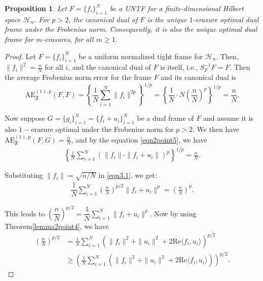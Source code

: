 \documentclass[final,1p,times]{elsarticle}
\newtheorem{prop}[thm]{Proposition}
\begin{document}
		

  \begin{prop}
Let \( F = \{f_i\}_{i=1}^N \) be a UNTF for a finite-dimensional Hilbert space \( \mathcal{H}_n \). For \( p > 2 \), the canonical dual of \( F \) is the unique  $1$-erasure optimal dual frame under the Frobenius norm. Consequently, it is also the unique optimal dual frame for $m$-erasures, for all \( m \geq 1 \).
\end{prop}


	

        
          \begin{proof}
Let \( F = \{f_i\}_{i=1}^N \) be a uniform normalized tight frame for \( \mathcal{H}_n \). Then,  \( \|f_i\|^2 = \frac{n}{N} \) for all \( i \), and the canonical dual of \( F \) is itself, i.e., \( S_F^{-1}F = F \). Then the average Frobenius norm error for the frame $F$ and its canonical dual is
$$\mathrm{AE}_{\mathfrak{F}}^{(1),p}(F, F) = \left\{ \frac{1}{N} \sum_{i=1}^N \|f_i\|^{2p} \right\}^{1/p} = \left\{ \frac{1}{N} \cdot N \left( \frac{n}{N} \right)^p \right\}^{1/p} = \frac{n}{N}.$$


Now suppose \( G = \{g_i\}_{i=1}^N = \{f_i + u_i\}_{i=1}^N \) be a dual frame of \( F \) and assume it is also $1-$erasure optimal under the Frobenius norm for \( p > 2 \). We then have \( \mathrm{AE}_{\mathfrak{F}}^{(1),p}(F, G) = \frac{n}{N} \), and by the equation \eqref{eqn2point5}, we  have
\begin{align}\label{eqn3.1}
\left\{ \frac{1}{N} \sum_{i=1}^N \left( \|f_i\| \cdot \|f_i + u_i\| \right)^p \right\}^{1/p} = \frac{n}{N}.
\end{align}

Substituting \( \|f_i\| = \sqrt{n/N} \) in \eqref{eqn3.1}, we get:
\begin{align*}
\dfrac{1}{N} \sum_{i=1}^N \left( \frac{n}{N} \right)^{p/2} \|f_i + u_i\|^p = \left( \frac{n}{N} \right)^p.
\end{align*}

This leads to $\left( \dfrac{n}{N} \right)^{p/2} = \dfrac{1}{N} \sum\limits_{i=1}^N \|f_i + u_i\|^p.$ Now by using Theorem\ref{lemma2point4}, we have
\begin{align*}
\left( \frac{n}{N} \right)^{p/2} 
&= \frac{1}{N} \sum_{i=1}^N \left( \|f_i\|^2 + \|u_i\|^2 + 2 \mathrm{Re} \langle f_i, u_i \rangle \right)^{p/2} \\
&\geq \left( \frac{1}{N} \sum_{i=1}^N \left( \|f_i\|^2 + \|u_i\|^2 + 2 \mathrm{Re} \langle f_i, u_i \rangle \right) \right)^{p/2}.
\end{align*}


\end{proof}
\end{document}
